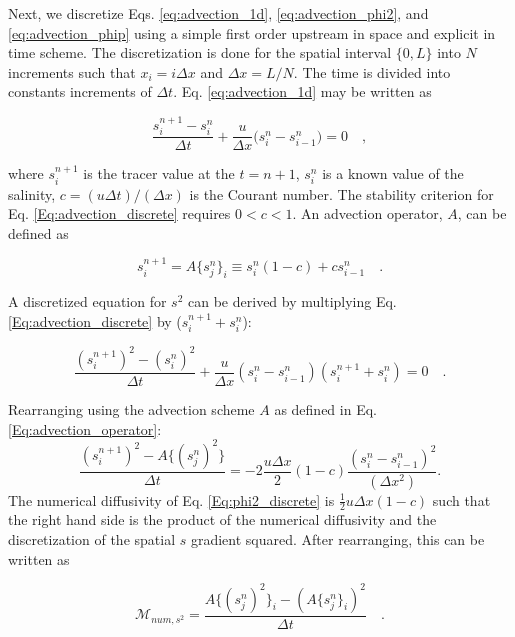 \documentclass[draft]{agujournal2019}
\begin{document}
Next, we discretize Eqs. \ref{eq:advection_1d}, \ref{eq:advection_phi2}, and \ref{eq:advection_phip} using a simple first order upstream in space and explicit in time scheme. The discretization is done for the spatial interval $\{0,L \}$ into $N$ increments such that $x_i = i \Delta x$ and $\Delta x = L/N$. The time is divided into constants increments of $\Delta t$. Eq. \ref{eq:advection_1d} may be written as
\begin{linenomath*}
\begin{equation} \label{Eq:advection_discrete}
    \frac{s_i^{n+1}-s_i^n}{\Delta t}+\frac{u}{\Delta x} \big(s_i^n -s_{i-1}^n \big) = 0 \quad ,
\end{equation}
\end{linenomath*}
where $s_i^{n+1}$ is the tracer value at the $t = n+1$, $s_i^n$ is a known value of the salinity, $c=(u \Delta t)/(\Delta x)$ is the Courant number. The stability criterion for Eq. \ref{Eq:advection_discrete} requires $0<c<1$. An advection operator, $A$, can be defined as
\begin{linenomath*}
\begin{equation} \label{Eq:advection_operator}
     s_{i}^{n+1} = A\{s_j^n \}_i \equiv  s_i^n(1-c)+cs_{i-1}^n \quad .
\end{equation}
\end{linenomath*}
A discretized equation for $s^2$ can be derived by multiplying Eq. \ref{Eq:advection_discrete} by ($s_i^{n+1}+s_i^n$):
\begin{linenomath*}
\begin{equation}
    \frac{(s_i^{n+1})^2-(s_i^n)^2}{\Delta t} + \frac{u}{\Delta x} (s_i^n-s_{i-1}^n)(s_i^{n+1}+s_i^n) = 0 \quad .
\end{equation}
\end{linenomath*}
Rearranging using the advection scheme $A$ as defined in Eq. \ref{Eq:advection_operator}:
\begin{equation} \label{Eq:phi2_discrete}
    \frac{(s_i^{n+1})^2-A \{(s_j^n)^2 \}}{\Delta t} = -2 \frac{u \Delta x}{2}(1-c) \frac{(s_i^n-s_{i-1}^{n})^2}{(\Delta x ^2)}.
\end{equation}
The numerical diffusivity of Eq. \ref{Eq:phi2_discrete} is $\frac{1}{2} u \Delta x (1-c)$ such that the right hand side is the product of the numerical diffusivity and the discretization of the spatial $s$ gradient squared. After rearranging, this can be written as
\begin{linenomath*}
\begin{equation} \label{Eq:mnum_phi2}
    \mathcal{M}_{num, s^2} = \frac{A\{(s_j^n)^2 \}_i-(A\{s_j^n\}_i)^2}{\Delta t} \quad .
\end{equation}
\end{linenomath*}
\end{document}
